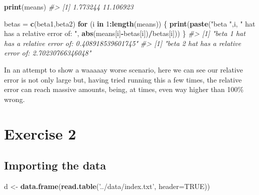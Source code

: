 \documentclass[]{article}
\newenvironment{Shaded}{\begin{snugshade}}{\end{snugshade}}
\newcommand{\CommentTok}[1]{\textcolor[rgb]{0.56,0.35,0.01}{\textit{#1}}}
\newcommand{\ControlFlowTok}[1]{\textcolor[rgb]{0.13,0.29,0.53}{\textbf{#1}}}
\newcommand{\DataTypeTok}[1]{\textcolor[rgb]{0.13,0.29,0.53}{#1}}
\newcommand{\DecValTok}[1]{\textcolor[rgb]{0.00,0.00,0.81}{#1}}
\newcommand{\KeywordTok}[1]{\textcolor[rgb]{0.13,0.29,0.53}{\textbf{#1}}}
\newcommand{\NormalTok}[1]{#1}
\newcommand{\OperatorTok}[1]{\textcolor[rgb]{0.81,0.36,0.00}{\textbf{#1}}}
\newcommand{\OtherTok}[1]{\textcolor[rgb]{0.56,0.35,0.01}{#1}}
\newcommand{\StringTok}[1]{\textcolor[rgb]{0.31,0.60,0.02}{#1}}
\begin{document}
\begin{Shaded}
\begin{Highlighting}[]
\KeywordTok{print}\NormalTok{(means)}
\CommentTok{#> [1]  1.773244 11.106923}
\end{Highlighting}
\end{Shaded}

\begin{Shaded}
\begin{Highlighting}[]
\NormalTok{betas =}\StringTok{ }\KeywordTok{c}\NormalTok{(beta1,beta2)}
\ControlFlowTok{for}\NormalTok{ (i }\ControlFlowTok{in} \DecValTok{1}\OperatorTok{:}\KeywordTok{length}\NormalTok{(means)) \{}
    \KeywordTok{print}\NormalTok{(}\KeywordTok{paste}\NormalTok{(}\StringTok{"beta "}\NormalTok{,i, }\StringTok{" hat has a relative error of: "}\NormalTok{, }\KeywordTok{abs}\NormalTok{(means[i]}\OperatorTok{-}\NormalTok{betas[i])}\OperatorTok{/}\NormalTok{betas[i]))}
\NormalTok{\}}
\CommentTok{#> [1] "beta  1  hat has a relative error of:  0.408918539601745"}
\CommentTok{#> [1] "beta  2  hat has a relative error of:  2.70230766346048"}
\end{Highlighting}
\end{Shaded}

In an attempt to show a waaaaay worse scenario, here we can see our
relative error is not only large but, having tried running this a few
times, the relative error can reach massive amounts, being, at times,
even way higher than 100\% wrong.

\newpage

\hypertarget{exercise-2}{%
\section{Exercise 2}\label{exercise-2}}

\hypertarget{importing-the-data}{%
\subsection{Importing the data}\label{importing-the-data}}

\begin{Shaded}
\begin{Highlighting}[]
\NormalTok{d <-}\StringTok{ }\KeywordTok{data.frame}\NormalTok{(}\KeywordTok{read.table}\NormalTok{(}\StringTok{'../data/index.txt'}\NormalTok{, }\DataTypeTok{header=}\OtherTok{TRUE}\NormalTok{))}
\end{Highlighting}
\end{Shaded}
\end{document}
